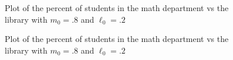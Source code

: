 \documentclass[12pt,letterpaper]{article}
\begin{document}
\begin{enumerate}
\begin{figure}[!htb]
  \caption{\label{fig:11} Plot of the percent of students in the math department vs the library with $m_{0} = .8$ and $\ell_{0} = .2$}
\end{figure}

\begin{figure}[!htb]
  \caption{\label{fig:12} Plot of the percent of students in the math department vs the library with $m_{0} = .8$ and $\ell_{0} = .2$}
\end{figure}
\vfill



\end{enumerate}
\end{document}
